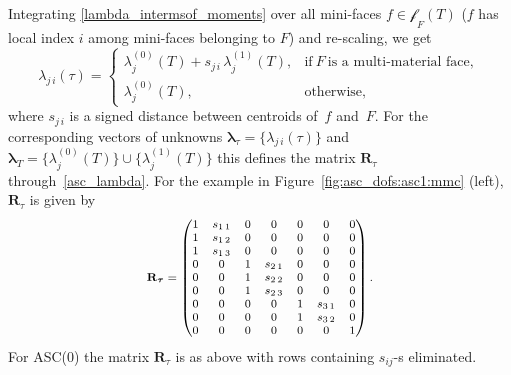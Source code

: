 \documentclass[12pt]{article}
\newcommand{\vect}[1]{\boldsymbol{\mathbf{#1}}}
\newcommand{\bcell}{T}
\newcommand{\mmesh}{{\vect{\mathcal \tau}}}
\newcommand{\bface}{F}
\newcommand{\bfaces}[1][]{{\vect{\mathcal F}_{\text{#1}}}}
\newcommand{\mfaces}[1][]{{\vect{\mathcal f}_{\text{#1}}}}
\begin{document}
	Integrating \eqref{lambda_intermsof_moments} over all mini-faces $f \in \mfaces_\bface(\bcell)$ ($f$ has local index $i$ among mini-faces belonging to $F$) and re-scaling, we get
	\begin{equation}\label{asc1_interp}
		\lambda_{j\,i}(\mmesh) =
		\begin{cases}
			\lambda^{(0)}_{j}(\bcell) +  s_{j\,i}\,\lambda^{(1)}_{j}(\bcell), & \text{if}~F~\text{is a multi-material face}, \\
			\lambda^{(0)}_{j}(\bcell),                                        & \text{otherwise},
		\end{cases}
	\end{equation}
	where $s_{j\,i} $ is a signed distance between centroids of~$f$  and~$F$. For the corresponding vectors of unknowns  ${\vect \lambda}_\mmesh = \{ \lambda_{j\,i}(\mmesh) \}$ and ${\vect \lambda}_\bcell = \{ \lambda^{(0)}_{j}(\bcell) \} \cup \{ \lambda^{(1)}_{j}(\bcell) \}$ this defines
	the matrix $\vect R_\mmesh$ through~\eqref{asc_lambda}. For the example in Figure~\ref{fig:asc_dofs:asc1:mmc} (left), $\vect R_\mmesh$ is given by
	\begin{equation*}\footnotesize
		\vect R_\mmesh
		=
		\begin{pmatrix}
			1 &  s_{1\,1} & 0 & 0 & 0 & 0 & 0 \\
			1 &  s_{1\,2} & 0 & 0 & 0 & 0 & 0 \\
			1 &  s_{1\,3} & 0 & 0 & 0 & 0 & 0 \\
			0 & 0 & 1 &  s_{2\,1} & 0 & 0 & 0 \\
			0 & 0 & 1 &  s_{2\,2} & 0 & 0 & 0 \\
			0 & 0 & 1 &  s_{2\,3} & 0 & 0 & 0 \\
			0 & 0 & 0 & 0 & 1 &  s_{3\,1} & 0 \\
			0 & 0 & 0 & 0 & 1 &  s_{3\,2} & 0 \\
			0 & 0 & 0 & 0 & 0 & 0 & 1
		\end{pmatrix}.		
	\end{equation*}
	For ASC(0) the matrix $\vect R_\mmesh$  is as above with rows containing $s_{ij}$-s eliminated.
	
\end{document}
